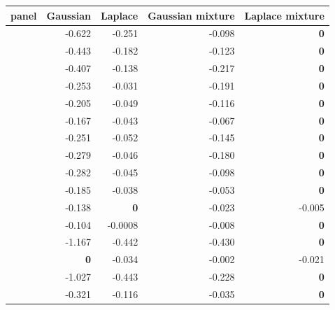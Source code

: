 {\small\setlength{\tabcolsep}{3.5pt}
\begin{tabular}{lrrrr}
\toprule
panel & Gaussian & Laplace & Gaussian mixture & Laplace mixture \\
\midrule
\adamsLo{} & -0.622 & -0.251 & -0.098 & \textbf{0} \\
\adamsMid{} & -0.443 & -0.182 & -0.123 & \textbf{0} \\
\adamsHi{} & -0.407 & -0.138 & -0.217 & \textbf{0} \\
\takacsCtl{} & -0.253 & -0.031 & -0.191 & \textbf{0} \\
\takacsDis{} & -0.205 & -0.049 & -0.116 & \textbf{0} \\
\takacsInt{} & -0.167 & -0.043 & -0.067 & \textbf{0} \\
\takacsOne{} & -0.251 & -0.052 & -0.145 & \textbf{0} \\
\becker{} & -0.279 & -0.046 & -0.180 & \textbf{0} \\
\vkg{} & -0.282 & -0.045 & -0.098 & \textbf{0} \\
\vkc{} & -0.185 & -0.038 & -0.053 & \textbf{0} \\
\senate{} & -0.138 & \textbf{0} & -0.023 & -0.005 \\
\house{} & -0.104 & -0.0008 & -0.008 & \textbf{0} \\
\cmv{} & -1.167 & -0.442 & -0.430 & \textbf{0} \\
\spinos{} & \textbf{0} & -0.034 & -0.002 & -0.021 \\
\kozitsin{} & -1.027 & -0.443 & -0.228 & \textbf{0} \\
\markets{} & -0.321 & -0.116 & -0.035 & \textbf{0} \\
\bottomrule
\end{tabular}}
\par{}
